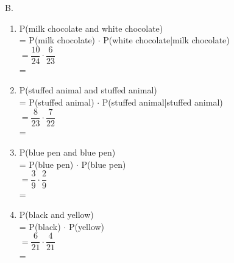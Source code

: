 B. %
\begin{enumerate}[label = \arabic*. ]
\item %
P(milk chocolate and white chocolate) \redcheck \\
= P(milk chocolate) $\cdot $ P(white chocolate|milk chocolate)  \redcheck \\
$ = \dfrac{10}{24} \cdot \dfrac{6}{23}  $ \redcheck \\
= \redcheck 
 

\item %
P(stuffed animal and stuffed animal) \redcheck \\
= P(stuffed animal) $\cdot $ P(stuffed animal|stuffed animal)  \redcheck \\
$ = \dfrac{8}{23} \cdot \dfrac{7}{22}  $ \redcheck \\
= \redcheck 
 

\item %
P(blue pen and blue pen) \redcheck \\
= P(blue pen) $\cdot $ P(blue pen)  \redcheck \\
$ = \dfrac{3}{9} \cdot \dfrac{2}{9}  $ \redcheck \\
= \redcheck 
 

\item %
P(black and yellow) \redcheck \\
=  P(black) $\cdot $ P(yellow)  \redcheck \\
$ = \dfrac{6}{21} \cdot \dfrac{4}{21}  $ \redcheck \\
= \redcheck 
 

\end{enumerate}   






